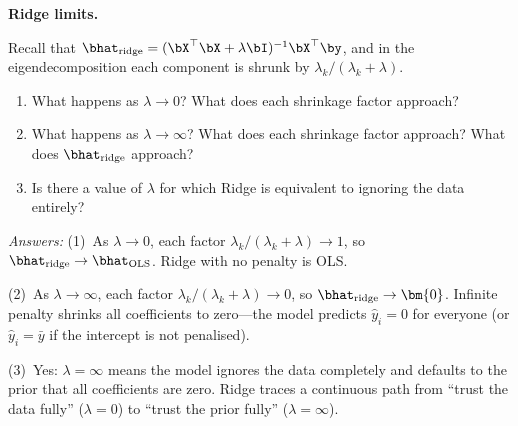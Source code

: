 \begin{stopandthink}
\textbf{Ridge limits.}

Recall that $\bhat_{\text{ridge}} = (\bX^\top\bX + \lambda\bI)^{-1}\bX^\top\by$,
and in the eigendecomposition each component is shrunk by
$\lambda_k / (\lambda_k + \lambda)$.
\begin{enumerate}[nosep]
  \item What happens as $\lambda \to 0$?
        What does each shrinkage factor approach?
  \item What happens as $\lambda \to \infty$?
        What does each shrinkage factor approach?
        What does $\bhat_{\text{ridge}}$ approach?
  \item Is there a value of $\lambda$ for which Ridge is
        equivalent to ignoring the data entirely?
\end{enumerate}
\emph{Answers:}
(1)~As $\lambda \to 0$, each factor $\lambda_k/(\lambda_k + \lambda) \to 1$,
so $\bhat_{\text{ridge}} \to \bhat_{\text{OLS}}$.
Ridge with no penalty is OLS.

(2)~As $\lambda \to \infty$, each factor $\lambda_k/(\lambda_k + \lambda) \to 0$,
so $\bhat_{\text{ridge}} \to \bm{0}$.
Infinite penalty shrinks all coefficients to zero---the model predicts
$\hat{y}_i = 0$ for everyone (or $\hat{y}_i = \bar{y}$ if the intercept
is not penalised).

(3)~Yes: $\lambda = \infty$ means the model ignores the data completely
and defaults to the prior that all coefficients are zero.
Ridge traces a continuous path from ``trust the data fully'' ($\lambda=0$)
to ``trust the prior fully'' ($\lambda=\infty$).
\end{stopandthink}



